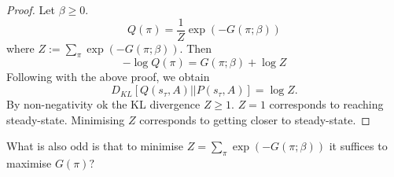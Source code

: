\documentclass{article}
\begin{document}
\begin{proof}
Let $\beta \geq 0$.
\begin{equation*}
   Q(\pi) = \frac{1}{Z}\exp(-G(\pi; \beta))
\end{equation*}
where $Z:= \sum_{\pi} \exp(-G(\pi; \beta))$. Then
\begin{equation*}
    -\log Q(\pi) = G(\pi; \beta) + \log Z
\end{equation*}
Following with the above proof, we obtain 
\begin{equation*}
    D_{KL}[Q(s_\tau, A) ||P(s_\tau, A)]= \log Z.
\end{equation*}
By non-negativity ok the KL divergence $Z \geq 1$. $Z=1$ corresponds to reaching steady-state. Minimising $Z$ corresponds to getting closer to steady-state.
\end{proof}

What is also odd is that to minimise $Z= \sum_{\pi} \exp(-G(\pi; \beta))$ it suffices to maximise $G(\pi)?$ 
\end{document}
